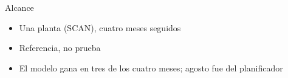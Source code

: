 \documentclass[aspectratio=169,11pt]{beamer}
\begin{document}
\begin{frame}{Alcance}
  \vspace{1.5em}
  \Large
  \begin{itemize}\setlength{\itemsep}{0.9em}
    \item Una planta (SCAN), cuatro meses seguidos
    \item Referencia, no prueba
    \item El modelo gana en tres de los cuatro meses; agosto fue del planificador
  \end{itemize}
\end{frame}
\end{document}
